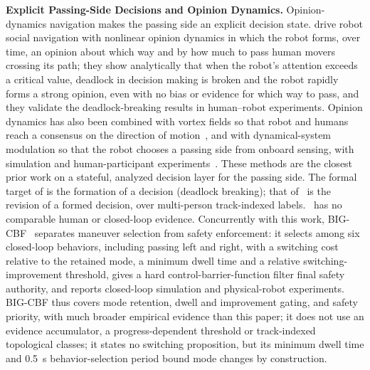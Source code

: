 \noindent\textbf{Explicit Passing-Side Decisions and Opinion Dynamics.} Opinion-dynamics navigation makes the passing side an explicit decision state. \citet{cathcart2023opinion} drive robot social navigation with nonlinear opinion dynamics in which the robot forms, over time, an opinion about which way and by how much to pass human movers crossing its path; they show analytically that when the robot's attention exceeds a critical value, deadlock in decision making is broken and the robot rapidly forms a strong opinion, even with no bias or evidence for which way to pass, and they validate the deadlock-breaking results in human--robot experiments. Opinion dynamics has also been combined with vortex fields so that robot and humans reach a consensus on the direction of motion~\citep{daddato2024oval}, and with dynamical-system modulation so that the robot chooses a passing side from onboard sensing, with simulation and human-participant experiments~\citep{chen2025socialdsm}. These methods are the closest prior work on a stateful, analyzed decision layer for the passing side. The formal target of \citet{cathcart2023opinion} is the formation of a decision (deadlock breaking); that of \sname\ is the revision of a formed decision, over multi-person track-indexed labels. \sname\ has no comparable human or closed-loop evidence. Concurrently with this work, BIG-CBF~\citep{li2026bigcbf} separates maneuver selection from safety enforcement: it selects among six closed-loop behaviors, including passing left and right, with a switching cost relative to the retained mode, a minimum dwell time and a relative switching-improvement threshold, gives a hard control-barrier-function filter final safety authority, and reports closed-loop simulation and physical-robot experiments. BIG-CBF thus covers mode retention, dwell and improvement gating, and safety priority, with much broader empirical evidence than this paper; it does not use an evidence accumulator, a progress-dependent threshold or track-indexed topological classes; it states no switching proposition, but its minimum dwell time and 0.5~s behavior-selection period bound mode changes by construction.

